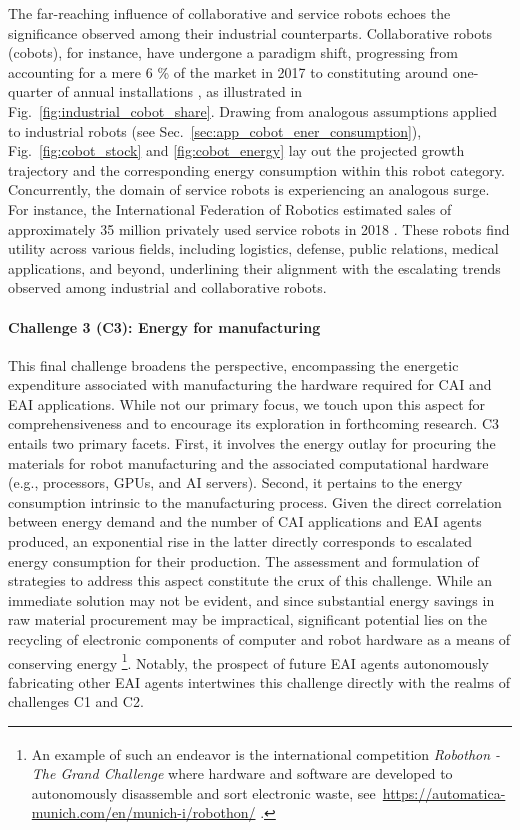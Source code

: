 \documentclass[12pt]{article}
\begin{document}
The far-reaching influence of collaborative and service robots echoes the significance observed among their industrial counterparts. Collaborative robots (cobots), for instance, have undergone a paradigm shift, progressing from accounting for a mere 6 \% of the market in 2017 to constituting around one-quarter of annual installations \cite{tobe2015}, as illustrated in Fig.~\ref{fig:industrial_cobot_share}. Drawing from analogous assumptions applied to industrial robots (see Sec.~\ref{sec:app_cobot_ener_consumption}), Fig.~\ref{fig:cobot_stock} and \ref{fig:cobot_energy} lay out the projected growth trajectory and the corresponding energy consumption within this robot category. Concurrently, the domain of service robots is experiencing an analogous surge. For instance, the International Federation of Robotics estimated sales of approximately 35 million privately used service robots in 2018 \cite{IFR2015}. These robots find utility across various fields, including logistics, defense, public relations, medical applications, and beyond, underlining their alignment with the escalating trends observed among industrial and collaborative robots.

\paragraph*{\textbf{Challenge 3} (C3): Energy for manufacturing}
This final challenge broadens the perspective, encompassing the energetic expenditure associated with manufacturing the hardware required for CAI and EAI applications. While not our primary focus, we touch upon this aspect for comprehensiveness and to encourage its exploration in forthcoming research. C3 entails two primary facets. First, it involves the energy outlay for procuring the materials for robot manufacturing and the associated computational hardware (e.g., processors, GPUs, and AI servers). Second, it pertains to the energy consumption intrinsic to the manufacturing process. Given the direct correlation between energy demand and the number of CAI applications and EAI agents produced, an exponential rise in the latter directly corresponds to escalated energy consumption for their production. The assessment and formulation of strategies to address this aspect constitute the crux of this challenge. While an immediate solution may not be evident, and since substantial energy savings in raw material procurement may be impractical, significant potential lies on the recycling of electronic components of computer and robot hardware as a means of conserving energy \footnote{An example of such an endeavor is the international competition  \textit{Robothon\textsuperscript{\textregistered} - The Grand Challenge} where hardware and software are developed to autonomously disassemble and sort electronic waste, see~\url{https://automatica-munich.com/en/munich-i/robothon/} .}. Notably, the prospect of future EAI agents autonomously fabricating other EAI agents intertwines this challenge directly with the realms of challenges C1 and C2.
\end{document}
